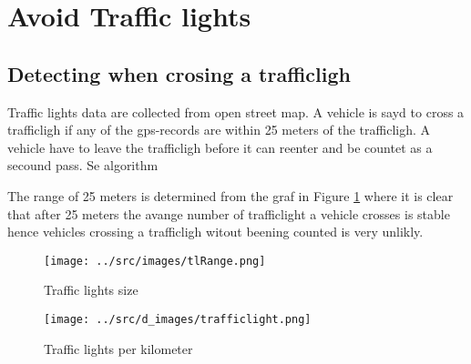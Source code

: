 \section{Avoid Traffic lights}

\subsection{Detecting when crosing a trafficligh}

Traffic lights data are collected from open street map. A vehicle is sayd to cross a trafficligh if any of the gps-records are within 25 meters of the trafficligh. A vehicle have to leave the trafficligh before it can reenter and be countet as a secound pass. Se algorithm %

The range of 25 meters is determined from the graf in Figure \ref{fig:traffclightsize} where it is clear that after 25 meters the avange number of trafficlight a vehicle crosses is stable hence vehicles crossing a trafficligh witout beening counted is very unlikly.


\begin{figure}[htb]
\centering
\texttt{[image: ../src/images/tlRange.png]}
\caption{Traffic lights size}
\label{fig:traffclightsize}
\end{figure}

\begin{figure}[htb]%
\centering
\texttt{[image: ../src/d\_images/trafficlight.png]}
\caption{Traffic lights per kilometer}
\label{fig:traffclight}
\end{figure}